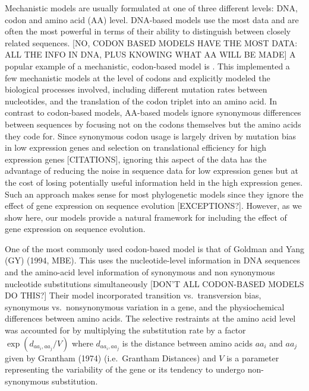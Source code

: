 \documentclass[13pt]{article}
\begin{document}
Mechanistic models are usually formulated at one of three different levels: DNA, codon and amino acid (AA) level.
DNA-based models use the most data and are often the most powerful in terms of their ability to distinguish between closely related sequences. [NO, CODON BASED MODELS HAVE THE MOST DATA: ALL THE INFO IN DNA, PLUS KNOWING WHAT AA WILL BE MADE]
A popular example of a mechanistic, codon-based model is \cite{YangEtAl98}.
This implemented a few mechanistic models at the level of codons and explicitly modeled the biological processes involved, including different mutation rates between nucleotides, and the translation of the codon triplet into an amino acid. 
In contrast to codon-based models, AA-based models ignore synonymous differences between sequences by focusing not on the codons themselves but the amino acids they code for.
Since synonymous codon usage is largely driven by mutation bias in low expression genes and selection on translational efficiency for high expression genes [CITATIONS], ignoring this aspect of the data has the advantage of reducing the noise in sequence data for low expression genes but at the cost of losing potentially useful information held in the high expression genes.
Such an approach makes sense for most phylogenetic models since they ignore the effect of gene expression on sequence evolution [EXCEPTIONS?].
However, as we show here, our models provide a natural framework for including the effect of gene expression on sequence evolution.


One of the most commonly used codon-based model is that of Goldman and Yang (GY) (1994, MBE).
This uses the nucleotide-level information in DNA sequences and the amino-acid level information of synonymous and non synonymous nucleotide substitutions simultaneously [DON'T ALL CODON-BASED MODELS DO THIS?]
Their model incorporated transition vs.~transversion bias, synonymous vs.~nonsynonymous variation in a gene, and the physiochemical differences between amino acids.
The selective restraints at the amino acid level was accounted for by multiplying the substitution rate by a factor $\exp (d_{aa_i,aa_j}/V)$ where $d_{aa_i, aa_j}$ is the distance between amino acids $aa_i$ and $aa_j$ given by Grantham (1974) (i.e.~Grantham Distances) and $V$ is a parameter representing the variability of the gene or its tendency to undergo non-synonymous substitution.
\end{document}
